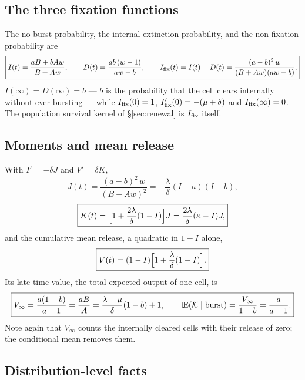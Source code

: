 \subsection{The three fixation functions}

The no-burst probability, the internal-extinction probability, and the
non-fixation probability are
\begin{equation}
\boxed{I(t)=\frac{aB+bAw}{B+Aw},\qquad
D(t)=\frac{ab\,(w-1)}{aw-b},\qquad
I_{\mathrm{fix}}(t)=I(t)-D(t)=\frac{(a-b)^2\,w}{(B+Aw)(aw-b)}.}
\label{eq:IDIhat}
\end{equation}
$I(\infty)=D(\infty)=b$ --- $b$ is the probability that the cell clears
internally without ever bursting --- while $I_{\mathrm{fix}}(0)=1$,
$I_{\mathrm{fix}}'(0)=-(\mu+\delta)$ and $I_{\mathrm{fix}}(\infty)=0$. The population survival
kernel of \S\ref{sec:renewal} is $I_{\mathrm{fix}}$ itself.

\subsection{Moments and mean release}

With $I'=-\delta J$ and $V'=\delta K$,
\begin{equation}
\boxed{J(t)=\frac{(a-b)^2\,w}{(B+Aw)^2}=-\frac{\lambda}{\delta}(I-a)(I-b),}
\label{eq:J}
\end{equation}
\begin{equation}
\boxed{K(t)=\Bigl[1+\frac{2\lambda}{\delta}(1-I)\Bigr]J
=\frac{2\lambda}{\delta}(\kappa-I)J,}
\label{eq:K}
\end{equation}
and the cumulative mean release, a quadratic in $1-I$ alone,
\begin{equation}
\boxed{V(t)=(1-I)\Bigl[1+\frac{\lambda}{\delta}(1-I)\Bigr].}
\label{eq:V}
\end{equation}
Its late-time value, the total expected output of one cell, is
\begin{equation}
\boxed{V_\infty=\frac{a(1-b)}{a-1}=\frac{aB}{A}
=\frac{\lambda-\mu}{\delta}(1-b)+1,
\qquad
{\rm I}\!{\rm E}(\mathcal{K}\mid\text{burst})=\frac{V_\infty}{1-b}=\frac{a}{a-1}.}
\label{eq:Vinf}
\end{equation}
Note again that $V_\infty$ counts the internally cleared cells with their
release of zero; the conditional mean removes them.

\subsection{Distribution-level facts}

